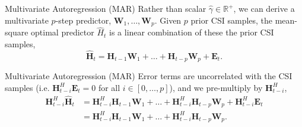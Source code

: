 \documentclass{beamer}
\begin{document}

  \begin{frame}{Multivariate Autoregression (MAR)}
    Rather than scalar $\hat\gamma \in \mathbb R^+$, we can derive a multivariate $p$-step predictor, $\mathbf W_1, \dots, \mathbf W_p$.
    Given $p$ prior CSI samples, the mean-square optimal predictor
    $\hat H_t$ is a linear combination of these the prior CSI samples,
    \begin{equation}
    \mathbf{\hat H}_{t} = \mathbf{H}_{t-1} \mathbf W_{1} + \dots + \mathbf{H}_{t-p} \mathbf W_{p} + \mathbf E_t.
    \end{equation}
  \end{frame}

  \begin{frame}{Multivariate Autoregression (MAR)}
    Error terms are uncorrelated with the CSI samples
    (i.e. $\mathbf H_{t-i}^H \mathbf E_t = 0$ for all $i \in [0, \dots, p]$),
    and we pre-multiply by $\mathbf H_{t-i}^H$,
    \begin{align}
    \mathbf{H}_{t-i}^H\mathbf{\hat H}_{t} &= \mathbf{H}_{t-i}^H\mathbf{H}_{t-1} \mathbf W_{1} + \dots + \mathbf{H}_{t-i}^H\mathbf{H}_{t-p} \mathbf W_{p} + \mathbf{H}_{t-i}^H\mathbf E_t \nonumber \\
                        &= \mathbf{H}_{t-i}^H\mathbf{H}_{t-1} \mathbf W_{1} + \dots + \mathbf{H}_{t-i}^H\mathbf{H}_{t-p} \mathbf W_{p}. \label{eq:var-init}
    \end{align}
  \end{frame}
\end{document}
